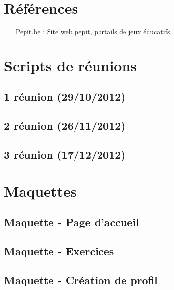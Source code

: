 \chapter{Références}
\begin{itemize}
\item[Pepit.be :] Site web pepit, portails de jeux éducatifs
\end{itemize}


\chapter{Scripts de réunions}
\section*{1\iere{} réunion (29/10/2012)}
\label{reunion1}

\section*{2\ieme{} réunion (26/11/2012)}

\section*{3\ieme{} réunion (17/12/2012)}



\chapter{Maquettes}
\section*{Maquette - Page d'accueil}
\section*{Maquette - Exercices}
\section*{Maquette - Création de profil}
